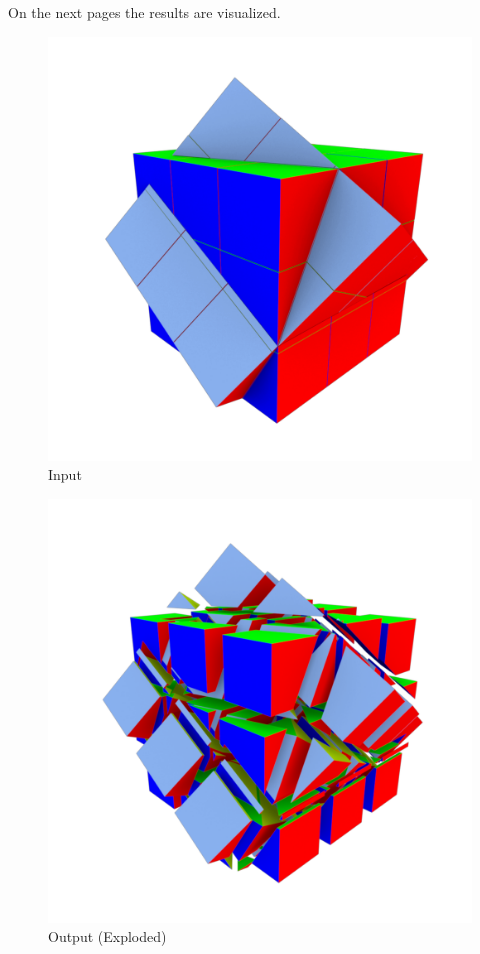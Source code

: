 On the next pages the results are visualized.
\begin{figure}[h]
    \includegraphics[width=\textwidth]{./img/test-0.pdf}%
    \caption{Input}
\end{figure}

\begin{figure}[h]
    \includegraphics[width=\textwidth]{./img/test-1.pdf}%
    \caption{Output (Exploded)}
\end{figure}

